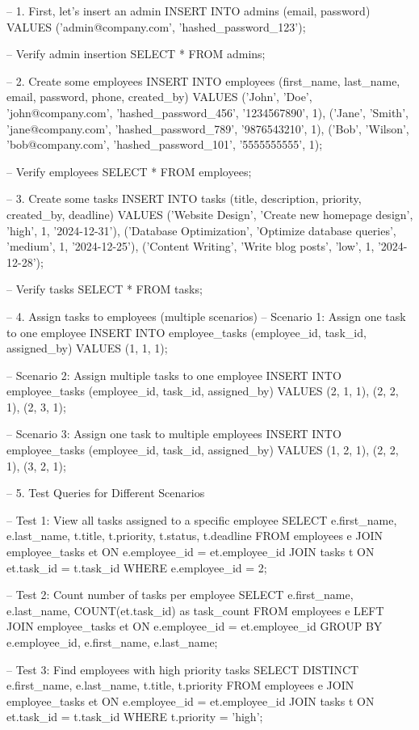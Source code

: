 -- 1. First, let's insert an admin
INSERT INTO admins (email, password) 
VALUES ('admin@company.com', 'hashed_password_123');

-- Verify admin insertion
SELECT * FROM admins;

-- 2. Create some employees
INSERT INTO employees (first_name, last_name, email, password, phone, created_by) 
VALUES 
('John', 'Doe', 'john@company.com', 'hashed_password_456', '1234567890', 1),
('Jane', 'Smith', 'jane@company.com', 'hashed_password_789', '9876543210', 1),
('Bob', 'Wilson', 'bob@company.com', 'hashed_password_101', '5555555555', 1);

-- Verify employees
SELECT * FROM employees;

-- 3. Create some tasks
INSERT INTO tasks (title, description, priority, created_by, deadline) 
VALUES 
('Website Design', 'Create new homepage design', 'high', 1, '2024-12-31'),
('Database Optimization', 'Optimize database queries', 'medium', 1, '2024-12-25'),
('Content Writing', 'Write blog posts', 'low', 1, '2024-12-28');

-- Verify tasks
SELECT * FROM tasks;

-- 4. Assign tasks to employees (multiple scenarios)
-- Scenario 1: Assign one task to one employee
INSERT INTO employee_tasks (employee_id, task_id, assigned_by) 
VALUES (1, 1, 1);

-- Scenario 2: Assign multiple tasks to one employee
INSERT INTO employee_tasks (employee_id, task_id, assigned_by) 
VALUES 
(2, 1, 1),
(2, 2, 1),
(2, 3, 1);

-- Scenario 3: Assign one task to multiple employees
INSERT INTO employee_tasks (employee_id, task_id, assigned_by) 
VALUES 
(1, 2, 1),
(2, 2, 1),
(3, 2, 1);

-- 5. Test Queries for Different Scenarios

-- Test 1: View all tasks assigned to a specific employee
SELECT 
    e.first_name,
    e.last_name,
    t.title,
    t.priority,
    t.status,
    t.deadline
FROM employees e
JOIN employee_tasks et ON e.employee_id = et.employee_id
JOIN tasks t ON et.task_id = t.task_id
WHERE e.employee_id = 2;

-- Test 2: Count number of tasks per employee
SELECT 
    e.first_name,
    e.last_name,
    COUNT(et.task_id) as task_count
FROM employees e
LEFT JOIN employee_tasks et ON e.employee_id = et.employee_id
GROUP BY e.employee_id, e.first_name, e.last_name;

-- Test 3: Find employees with high priority tasks
SELECT DISTINCT
    e.first_name,
    e.last_name,
    t.title,
    t.priority
FROM employees e
JOIN employee_tasks et ON e.employee_id = et.employee_id
JOIN tasks t ON et.task_id = t.task_id
WHERE t.priority = 'high';

